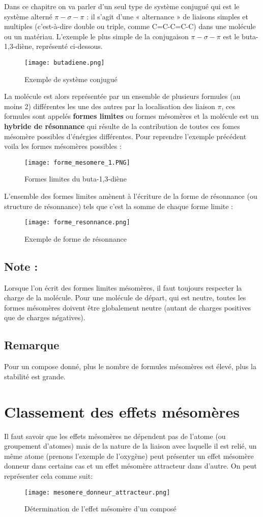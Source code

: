 \documentclass[a4paper, oneside]{book}
\begin{document}
Dans ce chapitre on va parler d'un seul type de système conjugué qui est le système alterné $\pi-\sigma-\pi$ : il s'agit d'une « alternance » de liaisons simples et multiples (c'est-à-dire double ou triple, comme C=C-C=C-C) dans une molécule ou un matériau. L'exemple le plus simple de la conjugaison $\pi-\sigma-\pi$ est le buta-1,3-diène, représenté ci-dessous.
\begin{figure}[!h]
    \centering
    \texttt{[image: butadiene.png]}
    \caption{Exemple de système conjugué}
    \label{fig:my_label}
\end{figure}

La molécule est alors représentée par un ensemble de plusieurs formules (au moins 2) différentes les une des autres par la localisation des liaison $\pi$, ces formules sont appelés \textbf{formes limites} ou formes mésomères et la molécule est un \textbf{hybride de résonnance} qui résulte de la contribution de toutes ces fomes mésomère possibles d'énérgies différentes. Pour reprendre l'exemple précédent voila les formes mésomères possibles :
\begin{figure}[!h]
    \centering
    \texttt{[image: forme\_mesomere\_1.PNG]}
    \caption{Formes limites du buta-1,3-diène}
    \label{fig:my_label}
\end{figure}
\newpage
L'ensemble des formes limites amènent à l'écriture de la forme de résonnance (ou structure de résonnance) tels que c'est la somme de chaque forme limite :
\begin{figure}[!h]
    \centering
    \texttt{[image: forme\_resonnance.png]}
    \caption{Exemple de forme de résonnance}
    \label{fig:my_label}
\end{figure}
\subsection*{Note :}
Lorsque l'on écrit des formes limites mésomères, il faut toujours respecter la charge de la molécule. Pour une molécule de départ, qui est neutre, toutes les formes mésomères doivent être globalement neutre (autant de charges positives que de charges négatives).
\subsection*{Remarque}
Pour un compose donné, plus le nombre de formules mésomères est élevé, plus la stabilité est grande. 
\section{Classement des effets mésomères}
Il faut savoir que les effets mésomères ne dépendent pas de l'atome (ou groupement d'atomes) mais de la nature de la liaison avec laquelle il est relié, un même atome (prenons l'exemple de l'oxygène) peut présenter un effet mésomère donneur dans certains cas et un effet mésomère attracteur dans d'autre. On peut représenter cela comme suit: 
\begin{figure}[!h]
    \centering
    \texttt{[image: mesomere\_donneur\_attracteur.png]}
    \caption{Détermination de l'effet mésomère d'un composé}
    \label{fig:my_label}
\end{figure}
\end{document}
